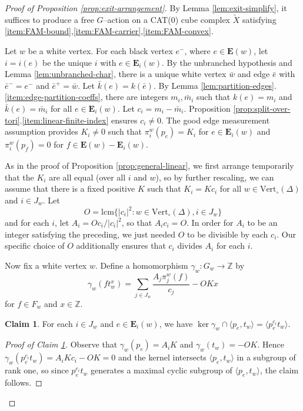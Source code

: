 \documentclass[11pt,oneside]{amsart}
\newcounter{ax}
\theoremstyle{definition}
\newtheorem{claim}{Claim}
\DeclareMathOperator{\kernel}{ker}
\newcommand{\field}[1]{\mathbb{#1}}
\newcommand{\integers}{\ensuremath{\field{Z}}}
\newcommand{\lcm}{\ensuremath{\mathrm{l}\mathrm{c}\mathrm{m}}}
\newcommand{\vertices}{\mathrm{Vert}}
\begin{document}
\begin{proof}[Proof of Proposition \ref{prop:exit-arrangement}]
By Lemma \ref{lem:exit-simplify}, it suffices to produce a free $G$--action on a CAT(0) cube complex $\widetilde X$ satisfying \eqref{item:FAM-bound},\eqref{item:FAM-carrier},\eqref{item:FAM-convex}.  

Let $w$ be a white vertex.  For each black vertex $e^-$, where $e\in \mathbf E(w)$, let $i=i(e)$ be the unique $i$ with $e\in \mathbf E_i(w)$.  By the unbranched hypothesis and Lemma \ref{lem:unbranched-char}, there is a unique white vertex $\bar w$ and edge $\bar e$ with $\bar e^-=e^-$ and $\bar e^+=\bar w$.  Let $\bar k(e)=k(\bar e)$.  By Lemma \ref{lem:partition-edges}.\eqref{item:edge-partition-coeffs}, there are integers $m_i,\bar m_i$ such that $k(e)=m_i$ and $\bar k(e)=\bar m_i$ for all $e\in \mathbf E_i(w)$. Let $c_i=m_i-\bar m_i$.  Proposition \ref{prop:split-over-tori}.\eqref{item:linear-finite-index} ensures $c_i\neq 0$.  The good edge measurement assumption provides $K_i\neq 0$ such that $\pi_i^w(p_e)=K_i$ for $e\in\mathbf E_i(w)$ and $\pi_i^w(p_f)=0$ for $f\in\mathbf E(w)-\mathbf E_i(w)$.

As in the proof of Proposition \ref{prop:general-linear}, we first arrange temporarily that the $K_i$ are all equal (over all $i$ and $w$), so by further rescaling, we can assume that there is a fixed positive $K$ such that $K_i=Kc_i$ for all $w\in\vertices_\circ(\Delta)$ and $i\in J_w$.  Let $$O=\lcm\{|c_i|^2:w\in\vertices_\circ(\Delta),i\in J_w\}$$
and for each $i$, let $A_i=Oc_i/|c_i|^2$, so that $A_ic_i=O$.  In order for $A_i$ to be an integer satisfying the preceding, we just needed $O$ to be divisible by each $c_i$.  Our specific choice of $O$ additionally ensures that $c_i$ divides $A_i$ for each $i$.

Now fix a white vertex $w$.  Define a homomorphism $\gamma_w:G_w\to\integers$ by
$$\gamma_w(ft_w^x)=\sum_{j\in J_w}\frac{A_j\pi_j^w(f)}{c_j}-OKx$$
for $f\in F_w$ and $x\in\integers$.


\begin{claim}\label{claim:exit-kernel}
For each $i\in J_w$ and $e\in \mathbf E_i(w)$, we have $\kernel\gamma_w\cap \langle p_e,t_w\rangle=\langle p_e^{c_i}t_w\rangle$.
\end{claim}
\renewcommand{\qedsymbol}{$\blacksquare$}

\begin{proof}[Proof of Claim \ref{claim:exit-kernel}]
Observe that $\gamma_w(p_e)=A_iK$ and $\gamma_w(t_w)=-OK$.  Hence $\gamma_w(p_e^{c_i}t_w)=A_iKc_i-OK=0$ and the kernel intersects $\langle p_e,t_w\rangle$ in a subgroup of rank one, so since $p_e^{c_i}t_w$ generates a maximal cyclic subgroup of $\langle p_e,t_w\rangle$, the claim follows. 
\end{proof}


\end{proof}
\end{document}
